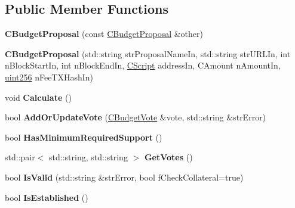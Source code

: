 \subsection*{Public Member Functions}
\begin{DoxyCompactItemize}
\item 
\mbox{\label{class_c_budget_proposal_a82ffaf35b2494a9e499aa59df44be56d}} 
{\bfseries C\+Budget\+Proposal} (const \mbox{\hyperlink{class_c_budget_proposal}{C\+Budget\+Proposal}} \&other)
\item 
\mbox{\label{class_c_budget_proposal_a28933edb02cfe0eec39fc0b2427cbcae}} 
{\bfseries C\+Budget\+Proposal} (std\+::string str\+Proposal\+Name\+In, std\+::string str\+U\+R\+L\+In, int n\+Block\+Start\+In, int n\+Block\+End\+In, \mbox{\hyperlink{class_c_script}{C\+Script}} address\+In, C\+Amount n\+Amount\+In, \mbox{\hyperlink{classuint256}{uint256}} n\+Fee\+T\+X\+Hash\+In)
\item 
\mbox{\label{class_c_budget_proposal_a62e5e004af90cfce33eddef90dcdb7e2}} 
void {\bfseries Calculate} ()
\item 
\mbox{\label{class_c_budget_proposal_ad153df04aa541d0c06eb068d79d0cf96}} 
bool {\bfseries Add\+Or\+Update\+Vote} (\mbox{\hyperlink{class_c_budget_vote}{C\+Budget\+Vote}} \&vote, std\+::string \&str\+Error)
\item 
\mbox{\label{class_c_budget_proposal_a839252a583d69a6d4301aa613fceab14}} 
bool {\bfseries Has\+Minimum\+Required\+Support} ()
\item 
\mbox{\label{class_c_budget_proposal_a60b112e2960d824dfcc8bc78414c09cc}} 
std\+::pair$<$ std\+::string, std\+::string $>$ {\bfseries Get\+Votes} ()
\item 
\mbox{\label{class_c_budget_proposal_afaa5e910085e8f0aea26aad6fa99ed2b}} 
bool {\bfseries Is\+Valid} (std\+::string \&str\+Error, bool f\+Check\+Collateral=true)
\item 
\mbox{\label{class_c_budget_proposal_a0f4231aa216c99a6a3ad2b6bf31d8bfe}} 
bool {\bfseries Is\+Established} ()

\end{DoxyCompactItemize}
